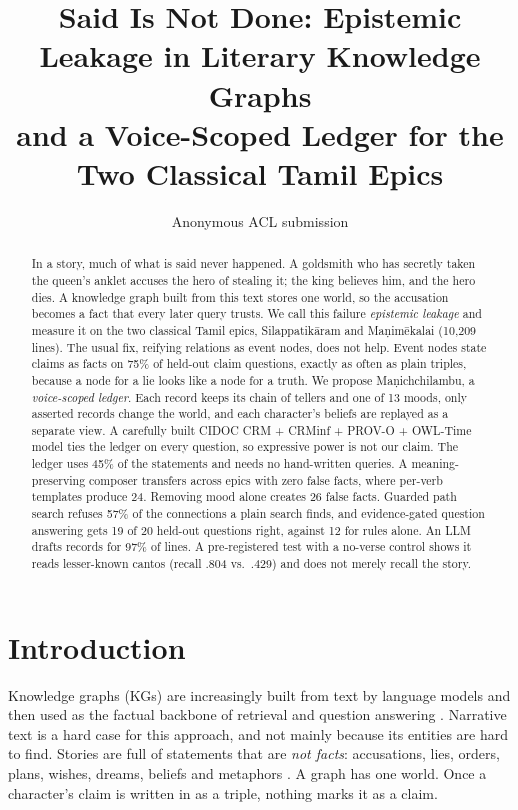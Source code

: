 \documentclass[11pt]{article}
\title{Said Is Not Done: Epistemic Leakage in Literary Knowledge Graphs\\and a Voice-Scoped Ledger for the Two Classical Tamil Epics}
\author{Anonymous ACL submission}
\newcommand{\sysname}{Ma\d{n}ichchilambu}
\begin{document}
\maketitle

\begin{abstract}
In a story, much of what is said never happened. A goldsmith who has secretly taken the queen's anklet accuses the hero of stealing it; the king believes him, and the hero dies. A knowledge graph built from this text stores one world, so the accusation becomes a fact that every later query trusts. We call this failure \emph{epistemic leakage} and measure it on the two classical Tamil epics, Silappatik\={a}ram and Ma\d{n}im\={e}kalai (10,209 lines). The usual fix, reifying relations as event nodes, does not help. Event nodes state claims as facts on 75\% of held-out claim questions, exactly as often as plain triples, because a node for a lie looks like a node for a truth. We propose \sysname{}, a \emph{voice-scoped ledger}. Each record keeps its chain of tellers and one of 13 moods, only asserted records change the world, and each character's beliefs are replayed as a separate view. A carefully built CIDOC CRM + CRMinf + PROV-O + OWL-Time model ties the ledger on every question, so expressive power is not our claim. The ledger uses 45\% of the statements and needs no hand-written queries. A meaning-preserving composer transfers across epics with zero false facts, where per-verb templates produce 24. Removing mood alone creates 26 false facts. Guarded path search refuses 57\% of the connections a plain search finds, and evidence-gated question answering gets 19 of 20 held-out questions right, against 12 for rules alone. An LLM drafts records for 97\% of lines. A pre-registered test with a no-verse control shows it reads lesser-known cantos (recall .804 vs.\ .429) and does not merely recall the story.
\end{abstract}

\section{Introduction}
\label{sec:intro}

Knowledge graphs (KGs) are increasingly built from text by language models and then used as the factual backbone of retrieval and question answering \citep{Hogan2021KnowledgeGraphs,Pan2024UnifyingLarge,Xu2024LargeLanguage,Edge2024FromLocal}. Narrative text is a hard case for this approach, and not mainly because its entities are hard to find. Stories are full of statements that are \emph{not facts}: accusations, lies, orders, plans, wishes, dreams, beliefs and metaphors \citep{Piper2021NarrativeTheory,Santana2023SurveyNarrative}. A graph has one world. Once a character's claim is written in as a triple, nothing marks it as a claim.
\end{document}
